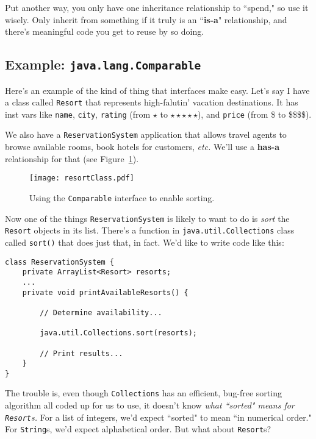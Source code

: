 Put another way, you only have one inheritance relationship to ``spend," so
use it wisely. Only inherit from something if it truly is an ``\textbf{is-a}"
relationship, and there's meaningful code you get to reuse by so doing.

\subsection{Example: \texttt{java.lang.Comparable}}

Here's an example of the kind of thing that interfaces make easy. Let's say I
have a class called \texttt{Resort} that represents high-falutin' vacation
destinations. It has inst vars like \texttt{name}, \texttt{city},
\texttt{rating} (from $\star$ to $\star\star\star\star\star$), and
\texttt{price} (from \$ to \$\$\$\$).

We also have a \texttt{ReservationSystem} application that allows travel
agents to browse available rooms, book hotels for customers, \textit{etc.}
We'll use a \textbf{has-a} relationship for that (see
Figure~\ref{fig:resortClass}).

\begin{figure}[ht]
\centering
\texttt{[image: resortClass.pdf]}
\caption{Using the \texttt{Comparable} interface to enable sorting.}
\label{fig:resortClass}
\end{figure}

Now one of the things \texttt{ReservationSystem} is likely to want to do is
\textit{sort} the \texttt{Resort} objects in its list. There's a function in
\texttt{java.util.Collections} class called \texttt{sort()} that does just
that, in fact. We'd like to write code like this:

\begin{Verbatim}[fontsize=\small,samepage=true,frame=single]
class ReservationSystem {
    private ArrayList<Resort> resorts;
    ...
    private void printAvailableResorts() {

        // Determine availability...

        java.util.Collections.sort(resorts);

        // Print results...
    }
}
\end{Verbatim}

The trouble is, even though \texttt{Collections} has an efficient, bug-free
sorting algorithm all coded up for us to use, it doesn't know \textit{what
``sorted" means for \texttt{Resort}s.} For a list of integers, we'd expect
``sorted" to mean ``in numerical order." For \texttt{String}s, we'd expect
alphabetical order. But what about \texttt{Resort}s?

